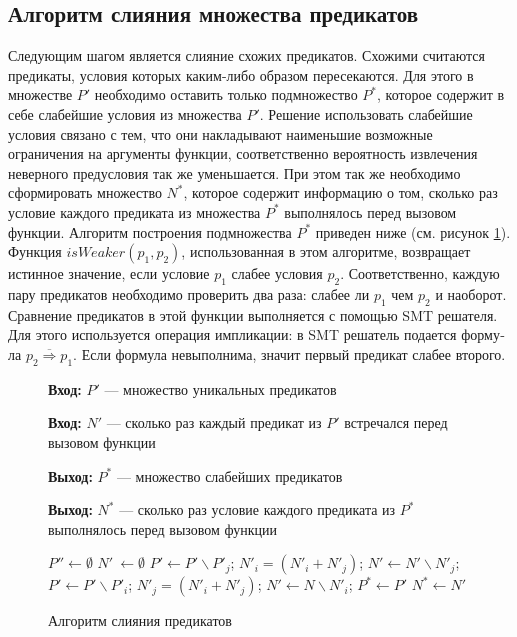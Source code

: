 \subsection{Алгоритм слияния множества предикатов}
Следующим шагом является слияние схожих предикатов. Схожими  считаются предикаты, условия которых каким-либо образом пересекаются. Для этого в множестве $P'$ необходимо оставить только подмножество $P^*$, которое содержит в себе слабейшие условия из множества $P'$. Решение использовать слабейшие условия связано с тем, что они накладывают наименьшие возможные ограничения на аргументы функции, соответственно вероятность извлечения неверного предусловия так же уменьшается. При этом так же необходимо сформировать множество $N^*$, которое содержит информацию о том, сколько раз условие каждого предиката из множества $P^*$ выполнялось перед вызовом функции. Алгоритм построения подмножества $P^*$ приведен ниже (см. рисунок \ref{image:megringAlgoritm}). Функция $isWeaker(p_1, p_2)$, использованная в этом алгоритме, возвращает истинное значение, если условие $p_1$ слабее условия $p_2$. Соответственно, каждую пару предикатов необходимо проверить два раза: слабее ли $p_1$ чем $p_2$ и наоборот. Сравнение предикатов в этой функции выполняется с помощью SMT решателя. Для этого исполь­зуется операция импликации: в SMT решатель подается форму­ла $\overline{p_2 \Longrightarrow p_1}$. Если формула невыполнима, значит первый предикат слабее второго.
\begin{figure}[h!]
\textbf{Вход:} $P'$ --- множество уникальных предикатов

\textbf{Вход:} $N'$ --- сколько раз каждый предикат из $P'$ встречался перед вызовом функции

\textbf{Выход:} $P^*$ --- множество слабейших предикатов

\textbf{Выход:} $N^*$ --- сколько раз условие каждого предиката из $P^*$ выполнялось перед вызовом функции

\begin{algorithmic}[1]
\State $P'' \leftarrow \emptyset$
\State $N'\ \leftarrow \emptyset$
			\State $P' \leftarrow P' \backslash P'_j$;
			\State $N'_i = (N'_i + N'_j)$;
			\State $N' \leftarrow N' \backslash N'_j$;
		\Else 
				\State $P' \leftarrow P' \backslash P'_i$;
				\State $N'_j = (N'_i + N'_j)$;
				\State $N' \leftarrow N \backslash N'_i$;
    			\EndIf
    		\EndIf
    \EndFor
\EndFor
\State $P^* \leftarrow P'$
\State $N^* \leftarrow N'$
\end{algorithmic}
\caption{Алгоритм слияния предикатов}
\label{image:megringAlgoritm}
\end{figure}

